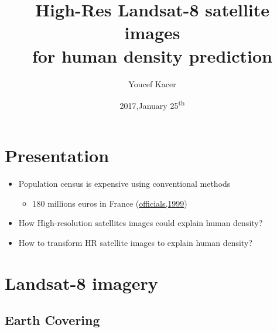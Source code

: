 \documentclass[c]{beamer}
\title[High-Res satellite images for human density prediction]{High-Res Landsat-8 satellite images \\for human density prediction}
\author{Youcef Kacer}
\institute{www.github.com/ykacer}
\date{2017,January 25\textsuperscript{th}}
\begin{document}
\begin{frame}
\titlepage
{}
\end{frame}

\begin{frame}
\tableofcontents
\end{frame}

\section{Presentation}
\begin{frame}
\tableofcontents[currentsection]
\end{frame}

\begin{frame}
\begin{itemize}
\item Population census is expensive using conventional methods\\
  \begin{itemize}
  \item 180 millions euros in France (\href{http://www.assemblee-nationale.fr/13/rap-info/i1246.asp}{officials,1999})\\ 
  \end{itemize}
\item How High-resolution satellites images could explain human density?\\
\item How to transform HR satellite images to explain human density?\\
\end{itemize}
\end{frame}

\section{Landsat-8 imagery}

\subsection{Earth Covering}
\begin{frame}[label=Covering]
\tableofcontents[currentsubsection]
\end{frame}
\end{document}
